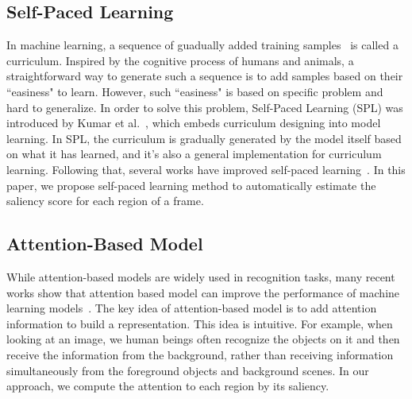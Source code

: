 \subsection{Self-Paced Learning}
\par
In machine learning, a sequence of guadually added training samples~\cite{bengio2009curriculum} is called a curriculum. Inspired by the cognitive process of humans and animals, a straightforward way to generate such a sequence is to add samples based on their ``easiness" to learn. However, such ``easiness" is based on specific problem and hard to generalize. In order to solve this problem, Self-Paced Learning (SPL) was introduced by Kumar et al.~\cite{kumar2010self}, which embeds curriculum designing into model learning. In SPL, the curriculum is gradually generated by the model itself based on what it has learned, and it's also a general implementation for curriculum learning. Following that, several works have improved self-paced learning~\cite{jiang2014easy, tang2012shifting, jiang2014self, jiang2015self}. In this paper, we propose self-paced learning method to automatically estimate the saliency score for each region of a frame.
\subsection{Attention-Based Model}
While attention-based models are widely used in recognition tasks, many recent works show that attention based model can improve the performance of machine learning models~\cite{mnih2014recurrent, zheng2015neural}. The key idea of attention-based model is to add attention information to build a representation. This idea is intuitive. For example, when looking at an image, we human beings often recognize the objects on it and then receive the information from the background, rather than receiving information simultaneously from the foreground objects and background scenes. In our approach, we compute the attention to each region by its saliency. 



